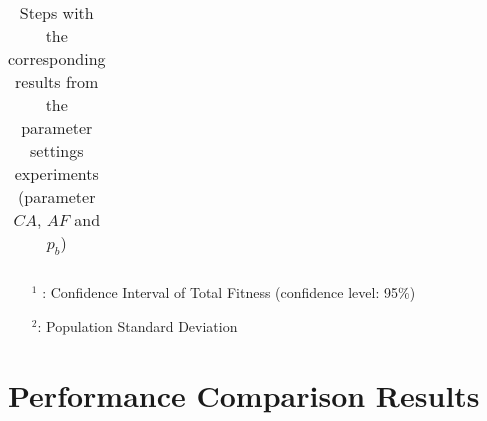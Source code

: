 \begin{table}
\begin{tabular}{|l|l|l|c||c|c|c|c|c|}
    \hline
    \end{tabular}
    \caption {Steps with the corresponding results from the parameter settings experiments (parameter $CA$, $AF$ and $p_b$)}
    \tiny
    \begin{itemize}[noitemsep]
    \item[$^1$ :] Confidence Interval of Total Fitness (confidence level: 95\%)
    \item[$^2$:] Population Standard Deviation 
    \end{itemize}
    \label{table:pm2}
\end{table}


\section{Performance Comparison Results}
\label{sec:performanceComparisonAppendix}


